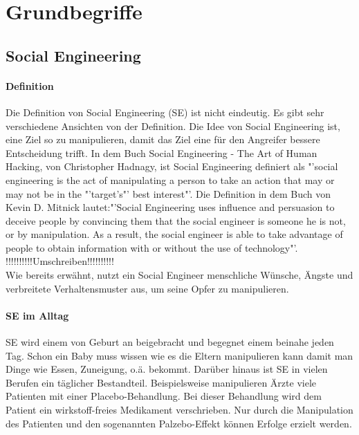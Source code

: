 
\chapter {Grundbegriffe}  %
\label{cha:grundlagen} %

\section{Social Engineering} %
\label {sec:Unterkapitel} %
\subsubsection{Definition}
Die Definition von Social Engineering (SE) ist nicht eindeutig. Es gibt sehr verschiedene Ansichten von der Definition. Die Idee von Social Engineering ist, eine Ziel so zu manipulieren, damit das Ziel eine für den Angreifer bessere Entscheidung trifft. In dem Buch Social Engineering - The Art of Human Hacking, von Christopher Hadnagy, ist Social Engineering definiert als "'social engineering is the act of manipulating a person to take an action that may or may not be in the "'target’s"' best interest"'\cite{ArtOfHumanHacking}. Die Definition in dem Buch von Kevin D. Mitnick lautet:"'Social Engineering uses influence and persuasion to deceive people by convincing them that the social engineer is someone he is not, or by manipulation. As a result, the social engineer is able to take advantage of people to obtain information with or without the use of technology"'\cite{ArtOfDeception}.\\
!!!!!!!!!!Umschreiben!!!!!!!!!!\\Wie bereits erwähnt, nutzt ein Social Engineer menschliche Wünsche, Ängste
und verbreitete Verhaltensmuster aus, um seine Opfer zu manipulieren.\cite{LeitfadenSE}\\

\subsubsection{SE im Alltag}
SE wird einem von Geburt an beigebracht und begegnet einem beinahe jeden Tag. Schon ein Baby muss wissen wie es die Eltern manipulieren kann damit man Dinge wie Essen, Zuneigung, o.ä. bekommt. Darüber hinaus ist SE in vielen Berufen ein täglicher Bestandteil. Beispielsweise manipulieren Ärzte viele Patienten mit einer Placebo-Behandlung. Bei dieser Behandlung wird dem Patient ein wirkstoff-freies Medikament verschrieben. Nur durch die Manipulation des Patienten und den sogenannten Palzebo-Effekt können Erfolge erzielt werden.\\

